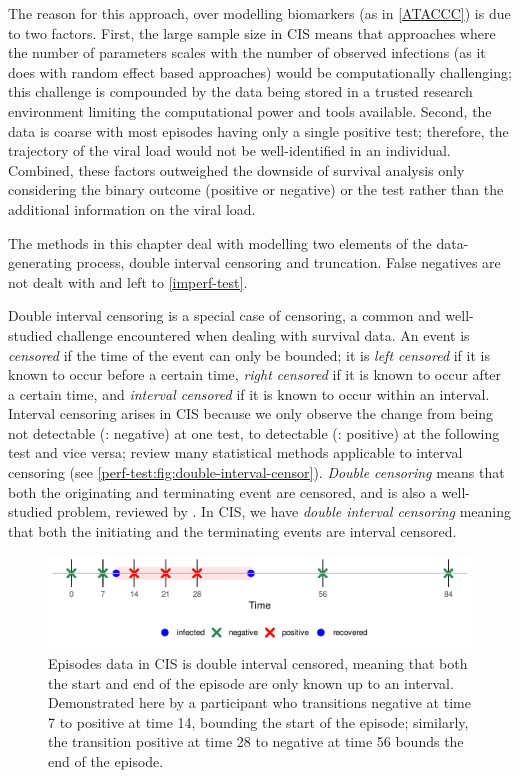 \documentclass[main.tex]{subfiles}
\begin{document}
The reason for this approach, over modelling biomarkers (as in \autoref{ATACCC}) is due to two factors.
First, the large sample size in CIS means that approaches where the number of parameters scales with the number of observed infections (as it does with random effect based approaches) would be computationally challenging; this challenge is compounded by the data being stored in a trusted research environment limiting the computational power and tools available.
Second, the data is coarse with most episodes having only a single positive test; therefore, the trajectory of the viral load would not be well-identified in an individual.
Combined, these factors outweighed the downside of survival analysis only considering the binary outcome (\ie positive or negative) or the test rather than the additional information on the viral load.

The methods in this chapter deal with modelling two elements of the data-generating process, double interval censoring and truncation.
False negatives are not dealt with and left to \autoref{imperf-test}.

Double interval censoring is a special case of censoring, a common and well-studied challenge encountered when dealing with survival data.
An event is \emph{censored} if the time of the event can only be bounded; it is \emph{left censored} if it is known to occur before a certain time, \emph{right censored} if it is known to occur after a certain time, and \emph{interval censored} if it is known to occur within an interval.
Interval censoring arises in CIS because we only observe the change from being not detectable (\ie: negative) at one test, to detectable (\ie: positive) at the following test and vice versa; \textcite{bogaertsSurvival} review many statistical methods applicable to interval censoring (see \autoref{perf-test:fig:double-interval-censor}).
\emph{Double censoring} means that both the originating and terminating event are censored, and is also a well-studied problem, reviewed by \textcite{sunStatisticala}.
In CIS, we have \emph{double interval censoring} meaning that both the initiating and the terminating events are interval censored.
\begin{figure}
  \centering \includegraphics{cis-perfect-testing/double-interval-censor}
  \caption{Episodes data in CIS is double interval censored, meaning that both the start and end of the episode are only known up to an interval. Demonstrated here by a participant who transitions negative at time 7 to positive at time 14, bounding the start of the episode; similarly, the transition positive at time 28 to negative at time 56 bounds the end of the episode. \label{perf-test:fig:double-interval-censor}}
\end{figure}
\end{document}
